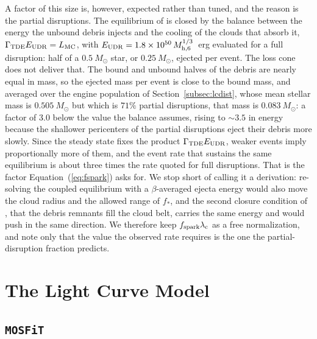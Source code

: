 \documentclass[twocolumn,pdftex]{aastex701}
\newcommand{\msun}{M_{\odot}\xspace}
\newcommand{\mhsix}{M_{\rm h,6}\xspace}
\newcommand{\mosfit}{{\tt MOSFiT}\xspace}
\newcommand{\fspark}{f_{\rm spark}\xspace}
\newcommand{\lamc}{\lambda_{\rm c}\xspace}
\begin{document}
A factor of this size is, however, expected rather than tuned, and the reason is the partial disruptions. The equilibrium of \citet{Guillochon:2026a} is closed by the balance between the energy the unbound debris injects and the cooling of the clouds that absorb it, $\Gamma_{\rm TDE} E_{\rm UDR} = L_{\rm MC}$, with $E_{\rm UDR} = 1.8 \times 10^{50}\, \mhsix^{1/3}$~erg evaluated for a full disruption: half of a $0.5~\msun$ star, or $0.25~\msun$, ejected per event. The loss cone does not deliver that. The bound and unbound halves of the debris are nearly equal in mass, so the ejected mass per event is close to the bound mass, and averaged over the engine population of Section~\ref{subsec:lcdist}, whose mean stellar mass is $0.505~\msun$ but which is $71\%$ partial disruptions, that mass is $0.083~\msun$: a factor of $3.0$ below the value the balance assumes, rising to $\sim 3.5$ in energy because the shallower pericenters of the partial disruptions eject their debris more slowly. Since the steady state fixes the product $\Gamma_{\rm TDE} E_{\rm UDR}$, weaker events imply proportionally more of them, and the event rate that sustains the same equilibrium is about three times the rate quoted for full disruptions. That is the factor Equation~(\ref{eq:fspark}) asks for. We stop short of calling it a derivation: re-solving the coupled equilibrium with a $\beta$-averaged ejecta energy would also move the cloud radius and the allowed range of $f_{\ast}$, and the second closure condition of \citet{Guillochon:2026a}, that the debris remnants fill the cloud belt, carries the same energy and would push in the same direction. We therefore keep $\fspark \lamc$ as a free normalization, and note only that the value the observed rate requires is the one the partial-disruption fraction predicts.

\section{The Light Curve Model}\label{sec:lightcurves}

\subsection{\mosfit}\label{subsec:mosfit}
\end{document}
